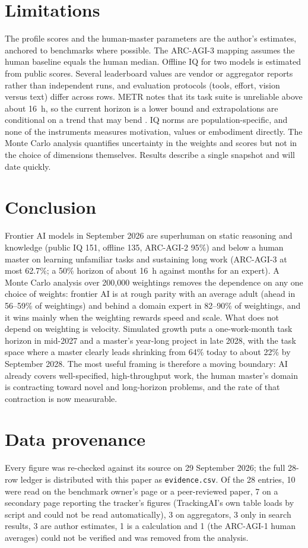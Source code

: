 \documentclass[11pt]{article}
\begin{document}
\section{Limitations}
The profile scores and the human-master parameters are the author's estimates, anchored to benchmarks where possible. The ARC-AGI-3 mapping assumes the human baseline equals the human median. Offline IQ for two models is estimated from public scores. Several leaderboard values are vendor or aggregator reports rather than independent runs, and evaluation protocols (tools, effort, vision versus text) differ across rows. METR notes that its task suite is unreliable above about 16~h, so the current horizon is a lower bound and extrapolations are conditional on a trend that may bend \citep{metrth}. IQ norms are population-specific, and none of the instruments measures motivation, values or embodiment directly. The Monte Carlo analysis quantifies uncertainty in the weights and scores but not in the choice of dimensions themselves. Results describe a single snapshot and will date quickly.

\section{Conclusion}
Frontier AI models in September 2026 are superhuman on static reasoning and knowledge (public IQ 151, offline 135, ARC-AGI-2 95\%) and below a human master on learning unfamiliar tasks and sustaining long work (ARC-AGI-3 at most 62.7\%; a 50\% horizon of about 16~h against months for an expert). A Monte Carlo analysis over 200,000 weightings removes the dependence on any one choice of weights: frontier AI is at rough parity with an average adult (ahead in 56--59\% of weightings) and behind a domain expert in 82--90\% of weightings, and it wins mainly when the weighting rewards speed and scale. What does not depend on weighting is velocity. Simulated growth puts a one-work-month task horizon in mid-2027 and a master's year-long project in late 2028, with the task space where a master clearly leads shrinking from 64\% today to about 22\% by September 2028. The most useful framing is therefore a moving boundary: AI already covers well-specified, high-throughput work, the human master's domain is contracting toward novel and long-horizon problems, and the rate of that contraction is now measurable.

\appendix
\section{Data provenance}
Every figure was re-checked against its source on 29 September 2026; the full 28-row ledger is distributed with this paper as \texttt{evidence.csv}. Of the 28 entries, 10 were read on the benchmark owner's page or a peer-reviewed paper, 7 on a secondary page reporting the tracker's figures (TrackingAI's own table loads by script and could not be read automatically), 3 on aggregators, 3 only in search results, 3 are author estimates, 1 is a calculation and 1 (the ARC-AGI-1 human averages) could not be verified and was removed from the analysis.
\end{document}
